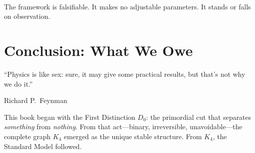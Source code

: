 \documentclass[11pt,a4paper]{book}
\begin{document}
\begin{code}
\<%
\\
\>[0]\AgdaSpace{}%
\AgdaSymbol{=}\AgdaSpace{}%
\<%
\\
\>[0][@{}l@{\AgdaIndent{0}}]%
\>[2]\AgdaSymbol{\{}\AgdaSpace{}%
%
\>[23]\AgdaSymbol{=}\AgdaSpace{}%
\<%
\\
%
\>[2]\AgdaSymbol{;}\AgdaSpace{}%
%
\>[23]\AgdaSymbol{=}\AgdaSpace{}%
\<%
\\
%
\>[2]\AgdaSymbol{;}\AgdaSpace{}%
%
\>[23]\AgdaSymbol{=}\AgdaSpace{}%
\<%
\\
%
\>[2]\AgdaSymbol{;}\AgdaSpace{}%
\AgdaSpace{}%
\AgdaSymbol{=}\AgdaSpace{}%
\<%
\\
%
\>[2]\AgdaSymbol{;}\AgdaSpace{}%
%
\>[23]\AgdaSymbol{=}\AgdaSpace{}%
\<%
\\
%
\>[2]\AgdaSymbol{;}\AgdaSpace{}%
%
\>[23]\AgdaSymbol{=}\AgdaSpace{}%
\<%
\\
%
\>[2]\AgdaSymbol{;}\AgdaSpace{}%
%
\>[23]\AgdaSymbol{=}\AgdaSpace{}%
\AgdaSpace{}%
\AgdaSymbol{\}}\<%
\end{code}

The framework is falsifiable. It makes no adjustable parameters. It stands or falls on observation.


\chapter*{Conclusion: What We Owe}
\label{ch:conclusion}

\epigraph{``Physics is like sex: sure, it may give some practical results, but that's not why we do it.''}{Richard P.~Feynman}

\bigskip

This book began with the First Distinction $D_0$: the primordial cut that separates \emph{something} from \emph{nothing}. From that act---binary, irreversible, unavoidable---the complete graph $K_4$ emerged as the unique stable structure. From $K_4$, the Standard Model followed.
\end{document}
